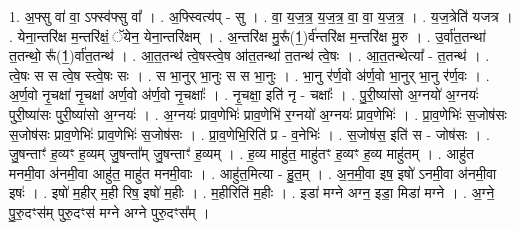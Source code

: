 \documentclass[17pt]{extarticle}
\begin{document}
1. अ॒फ्सु वा॑ वा॒ ऽफ्स्व॑फ्सु वा᳚ । . अ॒फ्स्वित्य॑प् - सु । . वा॒ य॒ज॒त्र॒ य॒ज॒त्र॒ वा॒ वा॒ य॒ज॒त्र॒ । . य॒ज॒त्रेति॑ यजत्र । . येना॒न्तरि॑क्ष म॒न्तरि॑क्षं॒ ॅयेन॒ येना॒न्तरि॑क्षम् । . अ॒न्तरि॑क्ष मु॒रू᳚(1॒)र्व॑न्तरि॑क्ष म॒न्तरि॑क्ष मु॒रु । . उ॒र्वा॑त॒तन्था॑ त॒तन्थो॒ रू᳚(1॒)र्वा॑त॒तन्थ॑ । . आ॒त॒तन्थ॑ त्वे॒षस्त्वे॒ष आ॑त॒तन्था॑ त॒तन्थ॑ त्वे॒षः । . आ॒त॒तन्थेत्या᳚ - त॒तन्थ॑ । . त्वे॒षः स स त्वे॒ष स्त्वे॒षः सः । . स भा॒नुर् भा॒नुः स स भा॒नुः । . भा॒नु र॑र्ण॒वो अ॑र्ण॒वो भा॒नुर् भा॒नु र॑र्ण॒वः । . अ॒र्ण॒वो नृ॒चक्षा॑ नृ॒चक्षा॑ अर्ण॒वो अ॑र्ण॒वो नृ॒चक्षाः᳚ । . नृ॒चक्षा॒ इति॑ नृ - चक्षाः᳚ । . पु॒री॒ष्या॑सो अ॒ग्नयो॑ अ॒ग्नयः॑ पुरी॒ष्या॑सः पुरी॒ष्या॑सो अ॒ग्नयः॑ । . अ॒ग्नयः॑ प्राव॒णेभिः॑ प्राव॒णेभि॑ र॒ग्नयो॑ अ॒ग्नयः॑ प्राव॒णेभिः॑ । . प्रा॒व॒णेभिः॑ स॒जोष॑सः स॒जोष॑सः प्राव॒णेभिः॑ प्राव॒णेभिः॑ स॒जोष॑सः । . प्रा॒व॒णेभि॒रिति॑ प्र - व॒नेभिः॑ । . स॒जोष॑स॒ इति॑ स - जोष॑सः । . जु॒षन्ताꣳ॑ ह॒व्यꣳ ह॒व्यम् जु॒षन्ता᳚म् जु॒षन्ताꣳ॑ ह॒व्यम् । . ह॒व्य माहु॑त॒ माहु॑तꣳ ह॒व्यꣳ ह॒व्य माहु॑तम् । . आहु॑त मनमी॒वा अ॑नमी॒वा आहु॑त॒ माहु॑त मनमी॒वाः । . आहु॑त॒मित्या - हु॒त॒म् । . अ॒न॒मी॒वा इष॒ इषो॑ ऽनमी॒वा अ॑नमी॒वा इषः॑ । . इषो॑ म॒हीर् म॒ही रिष॒ इषो॑ म॒हीः । . म॒हीरिति॑ म॒हीः । . इडा॑ मग्ने अग्न॒ इडा॒ मिडा॑ मग्ने । . अ॒ग्ने॒ पु॒रु॒दꣳस॑म् पुरु॒दꣳस॑ मग्ने अग्ने पुरु॒दꣳस᳚म् । \newline
\end{document}
